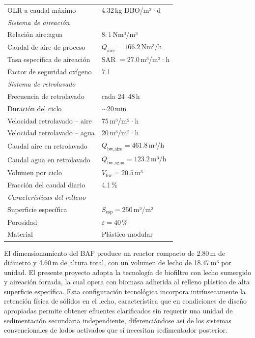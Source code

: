 \documentclass[12pt,a4paper]{article}
\begin{document}
\begin{longtable}{p{7cm}p{6cm}}
OLR a caudal máximo           & 4.32\,kg DBO/m³·d \\[4pt]
%
\multicolumn{2}{l}{\textit{Sistema de aireación}} \\[2pt]
Relación aire:agua            & $8:1$\,Nm³/m³ \\
Caudal de aire de proceso     & $Q_{\text{aire}} = 166.2$\,Nm³/h \\
Tasa específica de aireación  & SAR $= 27.0$\,m³/m²·h \\
Factor de seguridad oxígeno   & 7.1 \\[4pt]
%
\multicolumn{2}{l}{\textit{Sistema de retrolavado}} \\[2pt]
Frecuencia de retrolavado     & cada 24--48\,h \\
Duración del ciclo            & $\sim$20\,min \\
Velocidad retrolavado -- aire & 75\,m³/m²·h \\
Velocidad retrolavado -- agua & 20\,m³/m²·h \\
Caudal aire en retrolavado    & $Q_{\text{bw,aire}} = 461.8$\,m³/h \\
Caudal agua en retrolavado    & $Q_{\text{bw,agua}} = 123.2$\,m³/h \\
Volumen por ciclo             & $V_{\text{bw}} = 20.5$\,m³ \\
Fracción del caudal diario    & 4.1\,\% \\[4pt]
%
\multicolumn{2}{l}{\textit{Características del relleno}} \\[2pt]
Superficie específica         & $S_{\text{esp}} = 250$\,m²/m³ \\
Porosidad                     & $\varepsilon = 40$\,\% \\
Material                      & Plástico modular \\
\end{longtable}

El dimensionamiento del BAF produce un reactor compacto de 2.80\,m de diámetro y 4.60\,m de altura total, con un volumen de lecho de 18.47\,m³ por unidad. El presente proyecto adopta la tecnología de biofiltro con lecho sumergido y aireación forzada, la cual opera con biomasa adherida al relleno plástico de alta superficie específica. Esta configuración tecnológica incorpora intrínsecamente la retención física de sólidos en el lecho, característica que en condiciones de diseño apropiadas permite obtener efluentes clarificados sin requerir una unidad de sedimentación secundaria independiente, diferenciándose así de los sistemas convencionales de lodos activados que sí necesitan sedimentador posterior.
\end{document}
